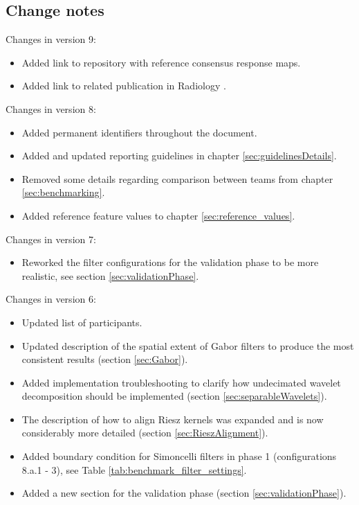 \documentclass[fleqn,a4paper,oneside,openany]{book}
\begin{document}
\subsection*{Change notes}

\noindent Changes in version 9:
\begin{itemize}
    \item Added link to repository with reference consensus response maps.
    \item Added link to related publication in Radiology \cite{Whybra2024-yb}.
\end{itemize}

\noindent Changes in version 8:
\begin{itemize}
    \item Added permanent identifiers throughout the document.
    \item Added and updated reporting guidelines in chapter \ref{sec:guidelinesDetails}.
    \item Removed some details regarding comparison between teams from chapter \ref{sec:benchmarking}.
    \item Added reference feature values to chapter \ref{sec:reference_values}.
\end{itemize}

\noindent Changes in version 7:
\begin{itemize}
    \item Reworked the filter configurations for the validation phase to be more realistic, see section \ref{sec:validationPhase}.
\end{itemize}

\noindent Changes in version 6:
\begin{itemize}
    \item Updated list of participants.
    \item Updated description of the spatial extent of Gabor filters to produce the most consistent results (section \ref{sec:Gabor}).
    \item Added implementation troubleshooting to clarify how undecimated wavelet decomposition should be implemented (section \ref{sec:separableWavelets}).
    \item The description of how to align Riesz kernels was expanded and is now considerably more detailed (section \ref{sec:RieszAlignment}).
    \item Added boundary condition for Simoncelli filters in phase 1 (configurations 8.a.1 - 3), see Table \ref{tab:benchmark_filter_settings}.
    \item Added a new section for the validation phase (section \ref{sec:validationPhase}).
\end{itemize}
\end{document}
